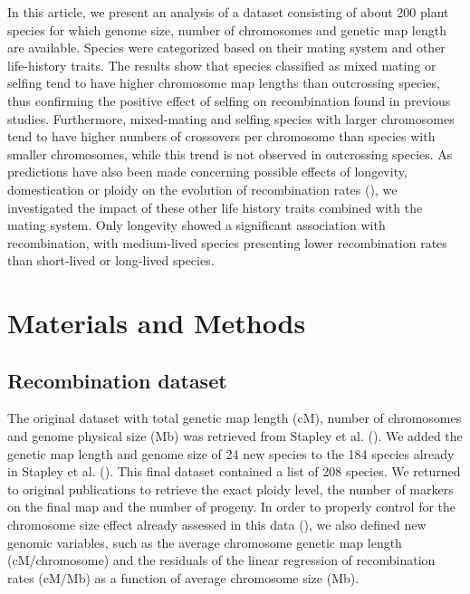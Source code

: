 \documentclass{article}
\begin{document}
In this article, we present an analysis of a dataset consisting of about 200 plant species for which genome size, number of chromosomes and genetic map length are available. Species were categorized based on their mating system and other life-history traits. The results show that species classified as mixed mating or selfing tend to have higher chromosome map lengths than outcrossing species, thus confirming the positive effect of selfing on recombination found in previous studies. Furthermore, mixed-mating and selfing species with larger chromosomes tend to have higher numbers of crossovers per chromosome than species with smaller chromosomes, while this trend is not observed in outcrossing species. As predictions have also been made concerning possible effects of longevity, domestication or ploidy on the evolution of recombination rates (\cite{ross-ibarraGenomeSizeRecombination2007a,burtMammalianChiasmaFrequencies1987,bombliesChallengeEvolvingStable2016}), we investigated the impact of these other life history traits combined with the mating system. Only longevity showed a significant association with recombination, with medium-lived species presenting lower recombination rates than short-lived or long-lived species.


\section*{Materials and Methods}


\subsection*{Recombination dataset}


The original dataset with total genetic map length (cM), number of chromosomes and genome physical size (Mb) was retrieved from Stapley et al. (\citeyear{stapleyVariationRecombinationFrequency2017}). We added the genetic map length and genome size of 24 new species to the 184 species already in Stapley et al. (\citeyear{stapleyVariationRecombinationFrequency2017}). This final dataset contained a list of 208 species. We returned to original publications to retrieve the exact ploidy level, the number of markers on the final map and the number of progeny. In order to properly control for the chromosome size effect already assessed in this data (\cite{stapleyVariationRecombinationFrequency2017}), we also defined new genomic variables, such as the average chromosome genetic map length (cM/chromosome) and the residuals of the linear regression of recombination rates (cM/Mb) as a function of average chromosome size (Mb).
\end{document}
